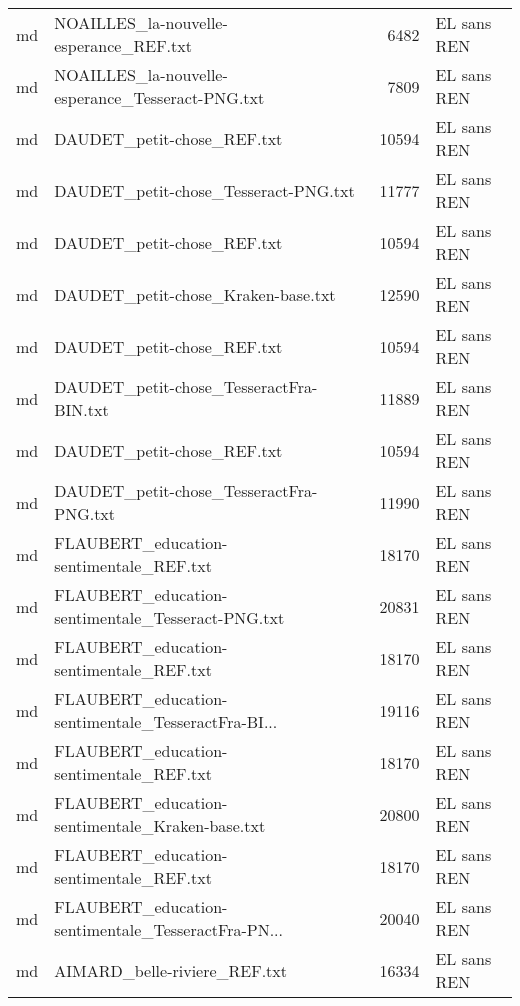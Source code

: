\begin{tabular}{llrl}
    md &             NOAILLES\_la-nouvelle-esperance\_REF.txt &                  6482 & EL sans REN \\
    md &   NOAILLES\_la-nouvelle-esperance\_Tesseract-PNG.txt &                  7809 & EL sans REN \\
    md &                         DAUDET\_petit-chose\_REF.txt &                 10594 & EL sans REN \\
    md &               DAUDET\_petit-chose\_Tesseract-PNG.txt &                 11777 & EL sans REN \\
    md &                         DAUDET\_petit-chose\_REF.txt &                 10594 & EL sans REN \\
    md &                 DAUDET\_petit-chose\_Kraken-base.txt &                 12590 & EL sans REN \\
    md &                         DAUDET\_petit-chose\_REF.txt &                 10594 & EL sans REN \\
    md &            DAUDET\_petit-chose\_TesseractFra-BIN.txt &                 11889 & EL sans REN \\
    md &                         DAUDET\_petit-chose\_REF.txt &                 10594 & EL sans REN \\
    md &            DAUDET\_petit-chose\_TesseractFra-PNG.txt &                 11990 & EL sans REN \\
    md &            FLAUBERT\_education-sentimentale\_REF.txt &                 18170 & EL sans REN \\
    md &  FLAUBERT\_education-sentimentale\_Tesseract-PNG.txt &                 20831 & EL sans REN \\
    md &            FLAUBERT\_education-sentimentale\_REF.txt &                 18170 & EL sans REN \\
    md & FLAUBERT\_education-sentimentale\_TesseractFra-BI... &                 19116 & EL sans REN \\
    md &            FLAUBERT\_education-sentimentale\_REF.txt &                 18170 & EL sans REN \\
    md &    FLAUBERT\_education-sentimentale\_Kraken-base.txt &                 20800 & EL sans REN \\
    md &            FLAUBERT\_education-sentimentale\_REF.txt &                 18170 & EL sans REN \\
    md & FLAUBERT\_education-sentimentale\_TesseractFra-PN... &                 20040 & EL sans REN \\
    md &                       AIMARD\_belle-riviere\_REF.txt &                 16334 & EL sans REN \\

\end{tabular}
